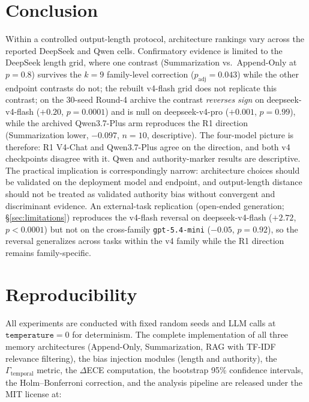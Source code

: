 \documentclass[11pt]{article}
\begin{document}
\section{Conclusion}

Within a controlled output-length protocol, architecture rankings vary across the reported DeepSeek and Qwen cells. Confirmatory evidence is limited to the DeepSeek length grid, where one contrast (Summarization vs.\ Append-Only at $p{=}0.8$) survives the $k{=}9$ family-level correction ($p_{\text{adj}}{=}0.043$) while the other endpoint contrasts do not; the rebuilt v4-flash grid does not replicate this contrast; on the 30-seed Round-4 archive the contrast \emph{reverses sign} on deepseek-v4-flash ($+0.20$, $p{=}0.0001$) and is null on deepseek-v4-pro ($+0.001$, $p{=}0.99$), while the archived Qwen3.7-Plus arm reproduces the R1 direction (Summarization lower, $-0.097$, $n{=}10$, descriptive). The four-model picture is therefore: R1 V4-Chat and Qwen3.7-Plus agree on the direction, and both v4 checkpoints disagree with it. Qwen and authority-marker results are descriptive. The practical implication is correspondingly narrow: architecture choices should be validated on the deployment model and endpoint, and output-length distance should not be treated as validated authority bias without convergent and discriminant evidence. An external-task replication (open-ended generation; \S\ref{sec:limitations}) reproduces the v4-flash reversal on deepseek-v4-flash ($+2.72$, $p<0.0001$) but not on the cross-family \texttt{gpt-5.4-mini} ($-0.05$, $p{=}0.92$), so the reversal generalizes across tasks within the v4 family while the R1 direction remains family-specific.


\section*{Reproducibility}
\label{sec:reproducibility}

All experiments are conducted with fixed random seeds and LLM calls at $\texttt{temperature}=0$ for determinism. The complete implementation of all three memory architectures (Append-Only, Summarization, RAG with TF-IDF relevance filtering), the bias injection modules (length and authority), the $\Gamma_\text{temporal}$ metric, the $\Delta$ECE computation, the bootstrap 95\% confidence intervals, the Holm--Bonferroni correction, and the analysis pipeline are released under the MIT license at:
\end{document}
